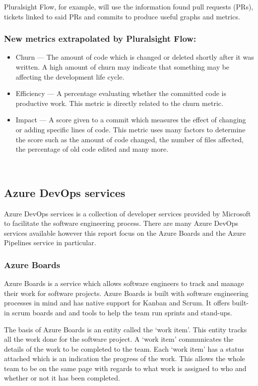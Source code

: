 \documentclass{article}
\begin{document}
Pluralsight Flow, for example, will use the information found pull requests
(PRs), tickets linked to said PRs and commits to produce useful graphs and
metrics.

\subsubsection{New metrics extrapolated by Pluralsight Flow:}
\begin{itemize}
  \item Churn --- The amount of code which is changed or deleted shortly after
    it was written. A high amount of churn may indicate that something may be
    affecting the development life cycle.
  \item Efficiency --- A percentage evaluating whether the committed code is
    productive work. This metric is directly related to the churn metric.
  \item Impact --- A score given to a commit which measures the effect of
    changing or adding specific lines of code. This metric uses many factors to
    determine the score such as the amount of code changed, the number of files
    affected, the percentage of old code edited and many more.
\end{itemize}
~\cite{plural2019sight2}

\subsection{Azure DevOps services}
Azure DevOps services is a collection of developer services provided by
Microsoft to facilitate the software engineering process. There are many Azure
DevOps services available however this report focus on the Azure Boards and the
Azure Pipelines service in particular.~\cite{azure2020devops}

\subsubsection{Azure Boards}
Azure Boards is a service which allows software engineers to track and manage
their work for software projects. Azure Boards is built with software
engineering processes in mind and has native support for Kanban and Scrum. It
offers built-in scrum boards and and tools to help the team run sprints and
stand-ups.

The basis of Azure Boards is an entity called the `work item'. This entity
tracks all the work done for the software project. A `work item' communicates
the details of the work to be completed to the team. Each `work item' has a
status attached which is an indication the progress of the work. This allows
the whole team to be on the same page with regards to what work is assigned to
who and whether or not it has been completed.
\end{document}
